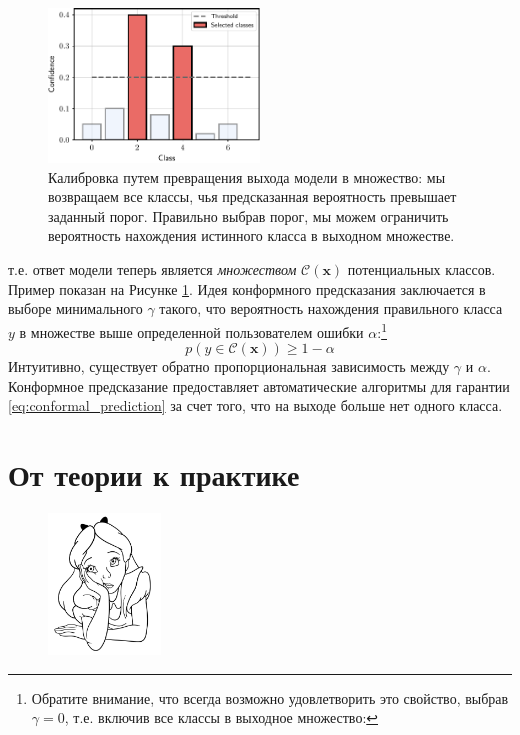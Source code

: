 \begin{figure}
    \centering
    \hspace{1em}\includegraphics[width=0.5\textwidth]{images/conformal_prediction.pdf}
    \caption{Калибровка путем превращения выхода модели в множество: мы возвращаем все классы, чья предсказанная вероятность превышает заданный порог. Правильно выбрав порог, мы можем ограничить вероятность нахождения истинного класса в выходном множестве.}
    \label{fig:conformal_prediction}
\end{figure}

т.е. ответ модели теперь является \textit{множеством} $\mathcal{C}(\mathbf{x})$ потенциальных классов. Пример показан на Рисунке \ref{fig:conformal_prediction}. Идея конформного предсказания заключается в выборе минимального $\gamma$ такого, что вероятность нахождения правильного класса $y$ в множестве выше определенной пользователем ошибки $\alpha$:\footnote{Обратите внимание, что всегда возможно удовлетворить это свойство, выбрав $\gamma = 0$, т.е. включив все классы в выходное множество:}
%
\begin{equation}
p(y \in \mathcal{C}(\mathbf{x})) \ge 1 -\alpha
\label{eq:conformal_prediction}
\end{equation}
%
Интуитивно, существует обратно пропорциональная зависимость между $\gamma$ и $\alpha$. Конформное предсказание предоставляет автоматические алгоритмы для гарантии \eqref{eq:conformal_prediction} за счет того, что на выходе больше нет одного класса.

\section*{От теории к практике}

\begin{figure}
\vspace{-3em}\includegraphics[width=3.0cm]{images/shutterstock_2075221579.jpg}
\vspace{-6em}
\end{figure}

